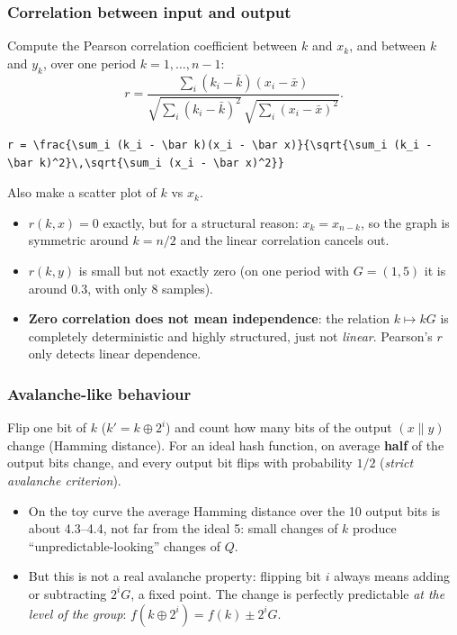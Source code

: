 \subsubsection{Correlation between input and output}

Compute the Pearson correlation coefficient between $k$ and $x_k$, and between $k$ and $y_k$, over one period $k = 1, \ldots, n-1$:
\[
  r = \frac{\sum_i (k_i - \bar k)(x_i - \bar x)}{\sqrt{\sum_i (k_i - \bar k)^2}\,\sqrt{\sum_i (x_i - \bar x)^2}} .
\]
\begin{lstlisting}[numbers=none]
r = \frac{\sum_i (k_i - \bar k)(x_i - \bar x)}{\sqrt{\sum_i (k_i - \bar k)^2}\,\sqrt{\sum_i (x_i - \bar x)^2}}\end{lstlisting}

Also make a scatter plot of $k$ vs $x_k$.
\begin{itemize}
  \item $r(k, x) = 0$ exactly, but for a structural reason: $x_k = x_{n-k}$, so the graph is symmetric around $k = n/2$ and the linear correlation cancels out.
  \item $r(k, y)$ is small but not exactly zero (on one period with $G = (1,5)$ it is around $0.3$, with only 8 samples).
  \item \textbf{Zero correlation does not mean independence}: the relation $k \mapsto kG$ is completely deterministic and highly structured, just not \textit{linear}. Pearson's $r$ only detects linear dependence.
\end{itemize}

\subsubsection{Avalanche-like behaviour}

Flip one bit of $k$ ($k' = k \oplus 2^i$) and count how many bits of the output $(x \| y)$ change (Hamming distance). For an ideal hash function, on average \textbf{half} of the output bits change, and every output bit flips with probability $1/2$ (\textit{strict avalanche criterion}).

\begin{itemize}
  \item On the toy curve the average Hamming distance over the 10 output bits is about 4.3--4.4, not far from the ideal 5: small changes of $k$ produce ``unpredictable-looking'' changes of $Q$.
  \item But this is not a real avalanche property: flipping bit $i$ always means adding or subtracting $2^i G$, a fixed point. The change is perfectly predictable \textit{at the level of the group}: $f(k \oplus 2^i) = f(k) \pm 2^i G$.
\end{itemize}

